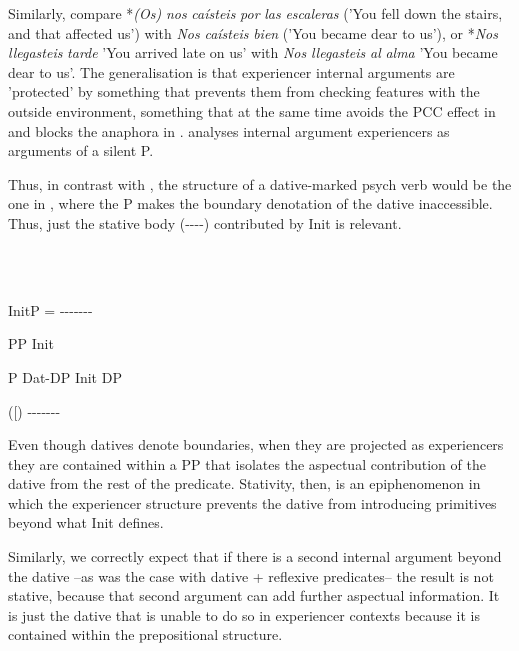 \documentclass[output=paper,modfonts,nonflat]{langsci/langscibook}
\begin{document}
Similarly, compare *\textit{(Os)} \textit{nos} \textit{caísteis} \textit{por} \textit{las} \textit{escaleras} ('You fell down the stairs, and that affected us') with \textit{Nos} \textit{caísteis} \textit{bien} ('You became dear to us'), or *\textit{Nos} \textit{llegasteis} \textit{tarde} 'You arrived late on us' with \textit{Nos} \textit{llegasteis} \textit{al} \textit{alma} 'You became dear to us'. The generalisation is that experiencer internal arguments are 'protected' by something that prevents them from checking features with the outside environment, something that at the same time avoids the PCC effect in  and blocks the anaphora in . \citet{Landau2010} analyses internal argument experiencers as arguments of a silent P.

Thus, in contrast with , the structure of a dative-marked psych verb would be the one in , where the P makes the boundary denotation of the dative inaccessible. Thus, just the stative body (-{}-{}-{}-) contributed by Init is relevant. 

\ea%
    \label{ex:key:31}
    \gll\\
        \\
    \glt
    \z

                                 InitP  = -{}-{}-{}-{}-{}-{}-


         PP                                       Init    


P                  Dat-DP            Init                DP

                  ([)                  {}-{}-{}-{}-{}-{}-{}-

Even though datives denote boundaries, when they are projected as experiencers they are contained within a PP that isolates the aspectual contribution of the dative from the rest of the predicate. Stativity, then, is an epiphenomenon in which the experiencer structure prevents the dative from introducing primitives beyond what Init defines. 

Similarly, we correctly expect that if there is a second internal argument beyond the dative –as was the case with dative + reflexive predicates– the result is not stative, because that second argument can add further aspectual information. It is just the dative that is unable to do so in experiencer contexts because it is contained within the prepositional structure.
\end{document}
